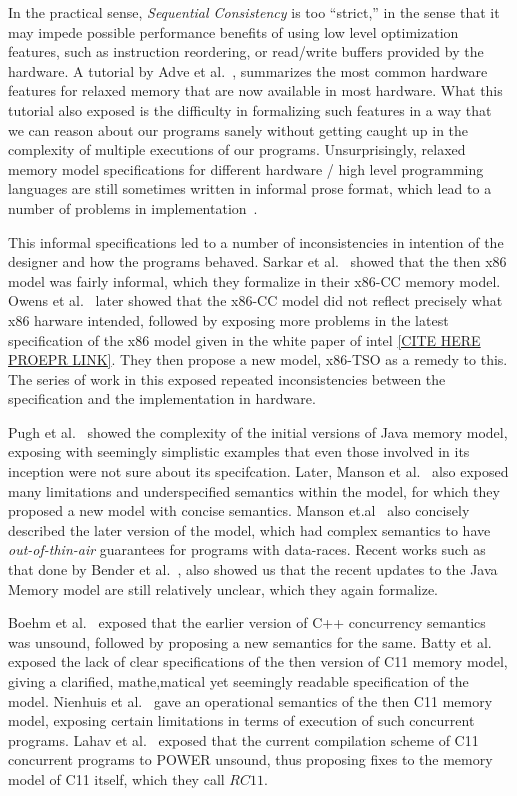 In the practical sense, \textit{Sequential Consistency} is too ``strict,'' in the sense that it may impede possible performance benefits of using low level optimization features, such as instruction reordering, or read/write buffers provided by the hardware.
A tutorial by Adve et al.~\cite{AdveG}, summarizes the most common hardware features for relaxed memory that are now available in most hardware. 
What this tutorial also exposed is the difficulty in formalizing such features in a way that we can reason about our programs sanely without getting caught up in the complexity of multiple executions of our programs. 
Unsurprisingly, relaxed memory model specifications for different hardware / high level programming languages are still sometimes written in informal prose format, which lead to a number of problems in implementation~\cite{Sewell}. 

This informal specifications led to a number of inconsistencies in intention of the designer and how the programs behaved.
Sarkar et al.~\cite{SarkarS} showed that the then x86 model was fairly informal, which they formalize in their x86-CC memory model. Owens et al.~\cite{OwensS} later showed that the x86-CC model did not reflect precisely what x86 harware intended, followed by exposing more problems in the latest specification of the x86 model given in the white paper of intel \ref{CITE HERE PROEPR LINK}. They then propose a new model, x86-TSO as a remedy to this. The series of work in this exposed repeated inconsistencies between the specification and the implementation in hardware. 

Pugh et al.~\cite{Pugh} showed the complexity of the initial versions of Java memory model, exposing with seemingly simplistic examples that even those involved in its inception were not sure about its specifcation. 
Later, Manson et al.~\cite{JeremyM} also exposed many limitations and underspecified semantics within the model, for which they proposed a new model with concise semantics. 
Manson et.al~\cite{Manson2} also concisely described the later version of the model, which had complex semantics to have \textit{out-of-thin-air} guarantees for programs with data-races. 
Recent works such as that done by Bender et al.~\cite{BenderJ}, also showed us that the recent updates to the Java Memory model are still relatively unclear, which they again formalize. 

Boehm et al.~\cite{Boehm} exposed that the earlier version of C++ concurrency semantics was unsound, followed by proposing a new semantics for the same.
Batty et al.~\cite{BattyM} exposed the lack of clear specifications of the then version of C11 memory model, giving a clarified, mathe,matical yet seemingly readable specification of the model.
Nienhuis et al.~\cite{Nienhuis} gave an operational semantics of the then C11 memory model, exposing certain limitations in terms of execution of such concurrent programs.
Lahav et al.~\cite{Lahav} exposed that the current compilation scheme of C11 concurrent programs to POWER unsound, thus proposing fixes to the memory model of C11 itself, which they call $RC11$.

